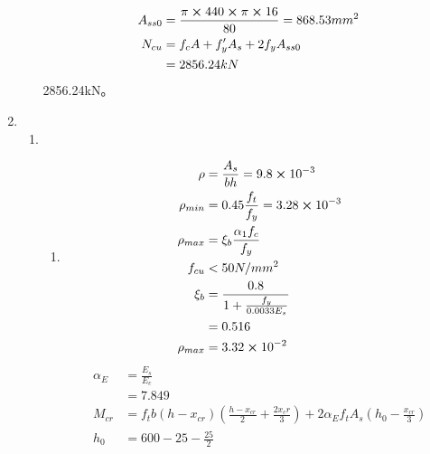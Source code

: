 \documentclass{article}
\begin{document}
\begin{enumerate}
\begin{enumerate}[1.]
\begin{align*}
                        A_{ss0} & =\frac{\pi\cross440\cross\pi\cross16}{80}=868.53mm^2 \\
                        N_{cu}  & =f_cA+f_y^{\prime}A_s+2f_yA_{ss0}                    \\
                                & =2856.24kN
                    \end{align*}
                    2856.24kN。
          \end{enumerate}
    \item \begin{enumerate}[1.]
              \item \begin{enumerate}
                        \item \begin{align*}
                                  \rho       & =\frac{A_s}{bh}=9.8\cross10^{-3}       \\
                                  \rho_{min} & =0.45\frac{f_t}{f_y}=3.28\cross10^{-3} \\
                                  \rho_{max} & =\xi_b\frac{\alpha_1f_c}{f_y}          \\
                                  f_{cu}     & <50N/mm^2                              \\
                                  \xi_b      & =\frac{0.8}{1+\frac{f_y}{0.0033E_s}}   \\
                                             & =0.516                                 \\
                                  \rho_{max} & =3.32\cross10^{-2}
                              \end{align*}
                              \begin{align*}
                                  \alpha_E & =\frac{E_s}{E_c}                                                                          \\
                                           & =7.849                                                                                    \\
                                  M_{cr}   & =f_tb(h-x_{cr})(\frac{h-x_{cr}}{2}+\frac{2x_cr}{3})+2\alpha_Ef_tA_s(h_0-\frac{x_{cr}}{3}) \\
                                  h_0      & =600-25-\frac{25}{2}                                                                      \\

\end{align*}
\end{enumerate}
\end{enumerate}
\end{enumerate}
\end{document}
